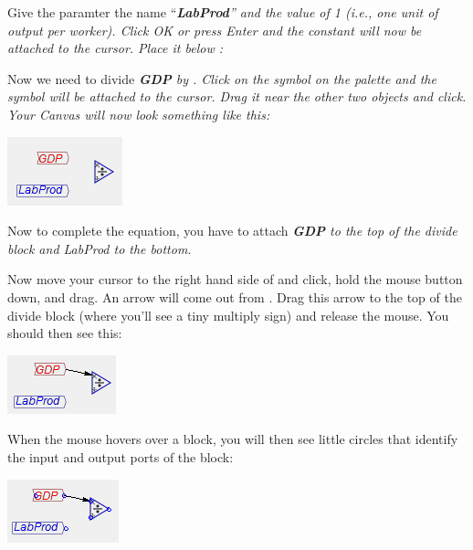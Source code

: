Give the paramter the name ``{\em\textbf{LabProd}'' and the value
of 1 (i.e., one unit of output per worker). Click OK or press Enter
and the constant  will now be attached to
the cursor. Place it below {\emGDP}:}
\begin{center}
\par\end{center}

Now we need to divide {\em\textbf{GDP} by {\emLabProd}. Click
on the  symbol on the palette and the symbol
will be attached to the cursor. Drag it near the other two objects
and click. Your Canvas will now look something like this:}
\begin{center}
\includegraphics{images/NewItem70} 
\par\end{center}

Now to complete the equation, you have to attach {\em\textbf{GDP}
to the top of the divide block and LabProd to the bottom.}

Now move your cursor to the right hand side of 
and click, hold the mouse button down, and drag. An arrow will come
out from . Drag this arrow to the top of the
divide block (where you'll see a tiny multiply sign) and release the
mouse. You should then see this:
\begin{center}
\includegraphics{images/NewItem74} 
\par\end{center}

When the mouse hovers over a block, you will then see little circles
that identify the input and output ports of the block:
\begin{center}
\includegraphics{images/NewItem75} 
\par\end{center}

